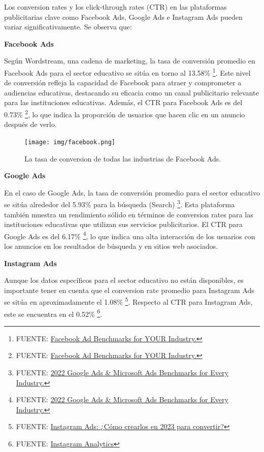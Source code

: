 \documentclass[
]{article}
\begin{document}
Los conversion rates y los click-through rates (CTR) en las plataformas
publicitarias clave como Facebook Ads, Google Ads e Instagram Ads pueden
variar significativamente. Se observa que:

\textbf{Facebook Ads}

Según Wordstream, una cadena de marketing, la tasa de conversión
promedio en Facebook Ads para el sector educativo se sitúa en torno al
13.58\% \footnote{FUENTE:
  \href{https://www.wordstream.com/blog/ws/2017/02/28/facebook-advertising-benchmarks}{Facebook
  Ad Benchmarks for YOUR Industry.}}. Este nivel de conversión refleja
la capacidad de Facebook para atraer y comprometer a audiencias
educativas, destacando su eficacia como un canal publicitario relevante
para las instituciones educativas. Además, el CTR para Facebook Ads es
del 0.73\% \footnote{FUENTE:
  \href{https://www.wordstream.com/blog/ws/2017/02/28/facebook-advertising-benchmarks}{Facebook
  Ad Benchmarks for YOUR Industry.}}, lo que indica la proporción de
usuarios que hacen clic en un anuncio después de verlo.

\begin{figure}
\centering
\texttt{[image: img/facebook.png]}
\caption{La tasa de conversion de todas las industrias de Facebook Ads.}
\end{figure}

\textbf{Google Ads}

En el caso de Google Ads, la tasa de conversión promedio para el sector
educativo se sitúa alrededor del 5.93\% para la búsqueda (Search)
\footnote{FUENTE:
  \href{https://www.wordstream.com/blog/ws/2022/05/18/search-advertising-benchmarks}{2022
  Google Ads \& Microsoft Ads Benchmarks for Every Industry.}}. Esta
plataforma también muestra un rendimiento sólido en términos de
conversion rates para las instituciones educativas que utilizan sus
servicios publicitarios. El CTR para Google Ads es del 6.17\%
\footnote{FUENTE:
  \href{https://www.wordstream.com/blog/ws/2022/05/18/search-advertising-benchmarks}{2022
  Google Ads \& Microsoft Ads Benchmarks for Every Industry.}}, lo que
indica una alta interacción de los usuarios con los anuncios en los
resultados de búsqueda y en sitios web asociados.

\textbf{Instagram Ads}

Aunque los datos específicos para el sector educativo no están
disponibles, es importante tener en cuenta que el conversion rate
promedio para Instagram Ads se sitúa en aproximadamente el 1.08\%
\footnote{FUENTE:
  \href{https://visme.co/blog/es/instagram-ads/}{Instagram Ads: ¿Cómo
  crearlos en 2023 para convertir?}}. Respecto al CTR para Instagram
Ads, este se encuentra en el 0.52\% \footnote{FUENTE:
  \href{https://lorenzo-gonzalez.com/instagram-analytics-las-9-metricas-mas-importantes-para-medir-tu-exito/\#:~:text=Tasas\%20de\%20clics\%20de\%20anuncios\%20(CTR),-El\%20objetivo\%20principal&text=Las\%20tasas\%20de\%20clics\%20promedio,\%2C52\%25\%2Cseg\%C3\%BAn\%20Adstage.}{Instagram
  Analytics}}.
\end{document}
